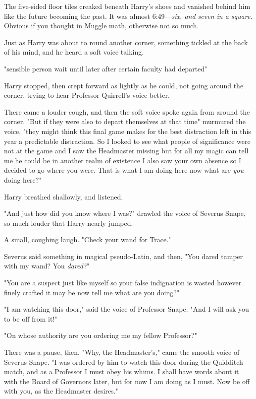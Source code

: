 The five-sided floor tiles creaked beneath Harry's shoes and vanished behind
him like the future becoming the past. It was almost 6:49—\emph{six, and seven
in a square.} Obvious if you thought in Muggle math, otherwise not so much.

Just as Harry was about to round another corner, something tickled at the back
of his mind, and he heard a soft voice talking.

"{\el}sensible person{\el} wait until later{\el} after certain faculty
had departed{\el}"

Harry stopped, then crept forward as lightly as he could, not going around the
corner, trying to hear Professor Quirrell's voice better.

There came a louder cough, and then the soft voice spoke again from around the
corner. "But if they were also{\el} to depart themselves{\el} at that
time{\el}" murmured the voice, "they might think{\el} this final
game{\el} makes for the best distraction{\el} left in this year{\el} a
predictable distraction. So I looked{\el} to see what people of
significance{\el} were not at the game{\el} and I saw the Headmaster
missing{\el} but for all my magic can tell me{\el} he could be in
another{\el} realm of existence{\el} I also saw your own absence{\el}
so I decided to go{\el} where you were. That is what I am doing here{\el}
now{\el} what are \emph{you} doing here?"

Harry breathed shallowly, and listened.

"And just how did you know where I was?" drawled the voice of Severus Snape, so
much louder that Harry nearly jumped.

A small, coughing laugh. "Check your wand{\el} for Trace."

Severus said something in magical pseudo-Latin, and then, "You dared tamper
with my wand? You \emph{dared?}"

"You are a suspect{\el} just like myself{\el} so your false indignation
is wasted{\el} however finely crafted it may be{\el} now tell me{\el}
what are you doing?"

"I am watching this door," said the voice of Professor Snape. "And I will ask
you to be off from it!"

"On whose authority{\el} are you ordering me{\el} my fellow Professor?"

There was a pause, then, "Why, the Headmaster's," came the smooth voice of
Severus Snape. "I was ordered by him to watch this door during the Quidditch
match, and as a Professor I must obey his whims. I shall have words about it
with the Board of Governors later, but for now I am doing as I must. Now be off
with you, as the Headmaster desires."


